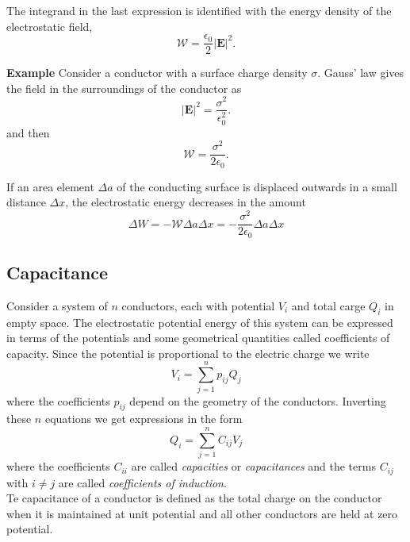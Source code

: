  The integrand in the last expression is identified with the energy density of the electrostatic field,
 \begin{equation}
 \mathcal{W} = \frac{\epsilon_0}{2} \left| \textbf{E} \right| ^2 .
 \end{equation}
 
 \textbf{Example}
Consider a conductor with a surface charge density $\sigma$. Gauss' law gives the field in the surroundings of the conductor as
 \begin{equation}
 \left| \textbf{E} \right| ^2 = \frac{\sigma^2}{\epsilon_0^2}.
 \end{equation}
 and then
 \begin{equation}
 \mathcal{W} = \frac{\sigma^2}{2\epsilon_0} .
 \end{equation}

If an area element $\Delta a$ of the conducting surface is displaced outwards in a small distance $\Delta x$, the electrostatic energy decreases in the amount
\begin{equation}
\Delta W = - \mathcal{W} \Delta a \Delta x = - \frac{\sigma^2}{2\epsilon_0}\Delta a \Delta x 
\end{equation}

\subsection{Capacitance}
Consider a system of $n$ conductors, each with potential $V_i$ and total carge $Q_i$ in empty space. The electrostatic potential energy of this system can be expressed in terms of the potentials and some geometrical quantities called coefficients of capacity. Since the potential is proportional to the electric charge we write
\begin{equation}
V_i = \sum_{j=1}^n p_{ij} Q_j
\end{equation}
where the coefficients $p_{ij}$ depend on the geometry of the conductors. Inverting these $n$ equations we get expressions in the form
\begin{equation}
Q_i = \sum_{j=1}^n C_{ij} V_j
\end{equation}
where the coefficients $C_{ii}$ are called \textit{capacities} or \textit{capacitances} and the terms $C_{ij}$ with $i\neq j$ are called \textit{coefficients of induction}.\\
Te capacitance of a conductor is defined as the total charge on the conductor when it is maintained at unit potential and all other conductors are held at zero potential.\\
\bigskip

